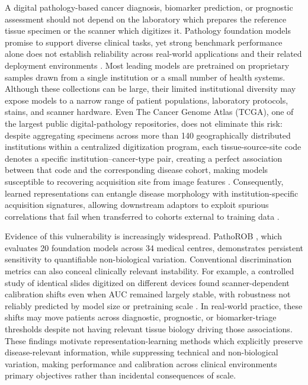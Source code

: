 \documentclass{article}
\begin{document}
A digital pathology-based cancer diagnosis, biomarker prediction, or prognostic assessment should not depend on the laboratory which prepares the reference tissue specimen or the scanner which digitizes it. Pathology foundation models promise to support diverse clinical tasks, yet strong benchmark performance alone does not establish reliability across real-world applications and their related deployment environments \citep{chen2024uni, huang2025flex}. Most leading models are pretrained on proprietary samples drawn from a single institution or a small number of health systems. Although these collections can be large, their limited institutional diversity may expose models to a narrow range of patient populations, laboratory protocols, stains, and scanner hardware. Even The Cancer Genome Atlas (TCGA), one of the largest public digital-pathology repositories, does not eliminate this risk: despite aggregating specimens across more than 140 geographically distributed institutions within a centralized digitization program, each tissue-source-site code denotes a specific institution--cancer-type pair, creating a perfect association between that code and the corresponding disease cohort, making models susceptible to recovering acquisition site from image features \citep{gdc_tss_codes,dehkharghanian2023biased}. Consequently, learned representations can entangle disease morphology with institution-specific acquisition signatures, allowing downstream adaptors to exploit spurious correlations that fail when transferred to cohorts external to training data \citep{huang2025flex}.

Evidence of this vulnerability is increasingly widespread. PathoROB \citep{koemen2026pathorob}, which evaluates 20 foundation models across 34 medical centres, demonstrates persistent sensitivity to quantifiable non-biological variation. Conventional discrimination metrics can also conceal clinically relevant instability. For example, a controlled study of identical slides digitized on different devices found scanner-dependent calibration shifts even when AUC remained largely stable, with robustness not reliably predicted by model size or pretraining scale \citep{thiringer2026scanner}. In real-world practice, these shifts may move patients across diagnostic, prognostic, or biomarker-triage thresholds despite not having relevant tissue biology driving those associations. These findings motivate representation-learning methods which explicitly preserve disease-relevant information, while suppressing technical and non-biological variation, making performance and calibration across clinical environments primary objectives rather than incidental consequences of scale.
\end{document}

